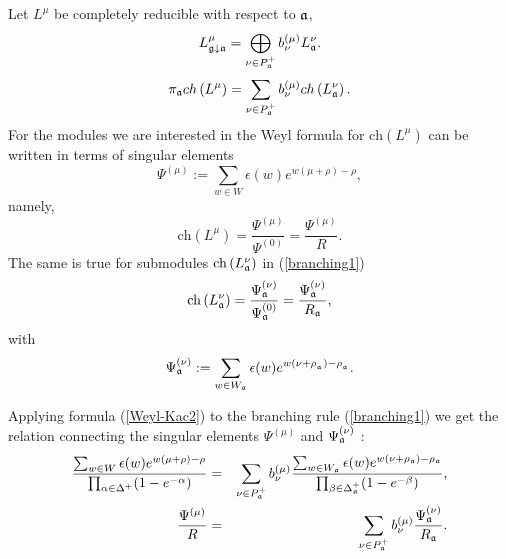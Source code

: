 \documentclass[12pt]{article}
\begin{document}
Let $L^{\mu }$ be completely reducible with respect to $\frak{a}$,
\[
L_{\frak{g}\downarrow \frak{a}}^{\mu }=\bigoplus\limits_{\nu \in P_{\frak{a}%
}^{+}}b_{\nu }^{\left( \mu \right) }L_{\frak{a}}^{\nu }.
\]
\begin{equation}
\pi _{\frak{a}}ch\left( L^{\mu }\right) =\sum_{\nu \in P_{\frak{a}%
}^{+}}b_{\nu }^{(\mu )}ch\left( L_{\frak{a}}^{\nu }\right) .
\label{branching1}
\end{equation}
For the modules we are interested in the Weyl formula for $\mathrm{ch}\left(
L^{\mu }\right) $ can be written in terms of singular elements \cite
{humphreys1997introduction}
\[
\Psi ^{\left( \mu \right) }:=\sum\limits_{w\in W}\epsilon (w)e^{w(\mu +\rho
)-\rho },
\]
namely,
\begin{equation}
\mathrm{ch}\left( L^{\mu }\right) =\frac{\Psi ^{\left( \mu \right) }}{\Psi
^{\left( 0\right) }}=\frac{\Psi ^{\left( \mu \right) }}{R}.
\label{Weyl-Kac2}
\end{equation}
The same is true for submodules $\mathrm{ch}\left( L_{\frak{a}}^{\nu
}\right) $ in (\ref{branching1})
\[
\mathrm{ch}\left( L_{\frak{a}}^{\nu }\right) =\frac{\Psi _{\frak{a}}^{\left(
\nu \right) }}{\Psi _{\frak{a}}^{\left( 0\right) }}=\frac{\Psi _{\frak{a}%
}^{\left( \nu \right) }}{R_{\frak{a}}},
\]
with
\[
\Psi _{\frak{a}}^{\left( \nu \right) }:=\sum\limits_{w\in W_{\frak{a}%
}}\epsilon (w)e^{w(\nu +\rho _{_{\frak{a}}})-\rho _{_{\frak{a}}}}.
\]

Applying formula (\ref{Weyl-Kac2}) to the branching rule (\ref{branching1})
we get the relation connecting the singular elements $\Psi ^{\left( \mu
\right) }$ and $\Psi _{\frak{a}}^{\left( \nu \right) }$ :
\begin{eqnarray}
\frac{\sum_{w \in W}\epsilon (w )e^{w (\mu +\rho )-\rho }}{\prod_{\alpha \in
\Delta ^{+}}(1-e^{-\alpha })} &=&\sum_{\nu \in P_{\frak{a}}^{+}}b_{\nu
}^{(\mu )}\frac{\sum_{w \in W_{\frak{a}}}\epsilon (w )e^{w (\nu +\rho _{%
\frak{a}})-\rho _{\frak{a}}}}{\prod_{\beta \in \Delta _{\frak{a}%
}^{+}}(1-e^{-\beta })},  \nonumber  \label{eq:4} \\
\frac{\Psi ^{\left( \mu \right) }}{R} &=&\sum_{\nu \in P_{\frak{a}%
}^{+}}b_{\nu }^{(\mu )}\frac{\Psi _{\frak{a}}^{\left( \nu \right) }}{R_{%
\frak{a}}}.  \label{singular main}
\end{eqnarray}
\end{document}
